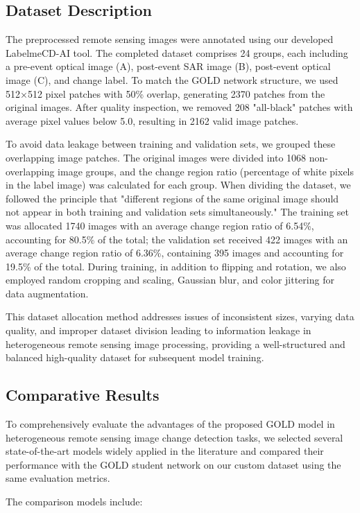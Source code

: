 \documentclass[a4paper,fleqn]{cas-dc}
\begin{document}
\subsection{Dataset Description}
The preprocessed remote sensing images were annotated using our developed LabelmeCD-AI tool. The completed dataset comprises 24 groups, each including a pre-event optical image (A), post-event SAR image (B), post-event optical image (C), and change label. To match the GOLD network structure, we used 512×512 pixel patches with 50\% overlap, generating 2370 patches from the original images. After quality inspection, we removed 208 "all-black" patches with average pixel values below 5.0, resulting in 2162 valid image patches.

To avoid data leakage between training and validation sets, we grouped these overlapping image patches. The original images were divided into 1068 non-overlapping image groups, and the change region ratio (percentage of white pixels in the label image) was calculated for each group. When dividing the dataset, we followed the principle that "different regions of the same original image should not appear in both training and validation sets simultaneously." The training set was allocated 1740 images with an average change region ratio of 6.54\%, accounting for 80.5\% of the total; the validation set received 422 images with an average change region ratio of 6.36\%, containing 395 images and accounting for 19.5\% of the total. During training, in addition to flipping and rotation, we also employed random cropping and scaling, Gaussian blur, and color jittering for data augmentation.

This dataset allocation method addresses issues of inconsistent sizes, varying data quality, and improper dataset division leading to information leakage in heterogeneous remote sensing image processing, providing a well-structured and balanced high-quality dataset for subsequent model training.

\subsection{Comparative Results}
To comprehensively evaluate the advantages of the proposed GOLD model in heterogeneous remote sensing image change detection tasks, we selected several state-of-the-art models widely applied in the literature and compared their performance with the GOLD student network on our custom dataset using the same evaluation metrics.

The comparison models include:
\end{document}
